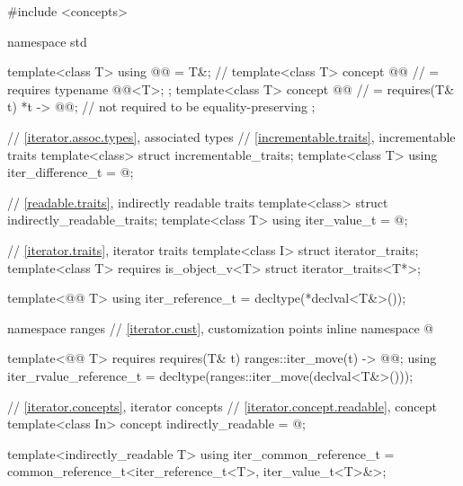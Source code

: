 %
%
%
\begin{codeblock}
#include <concepts>

namespace std {
  template<class T> using @@ = T&;  // \expos
  template<class T> concept @@       // \expos
    = requires { typename @@<T>; };
  template<class T> concept @@     // \expos
    = requires(T& t) {
      { *t } -> @@;  // not required to be equality-preserving
    };

  // \ref{iterator.assoc.types}, associated types
  // \ref{incrementable.traits}, incrementable traits
  template<class> struct incrementable_traits;
  template<class T>
    using iter_difference_t = @\seebelow@;

  // \ref{readable.traits}, indirectly readable traits
  template<class> struct indirectly_readable_traits;
  template<class T>
    using iter_value_t = @\seebelow@;

  // \ref{iterator.traits}, iterator traits
  template<class I> struct iterator_traits;
  template<class T> requires is_object_v<T> struct iterator_traits<T*>;

  template<@@ T>
    using iter_reference_t = decltype(*declval<T&>());

  namespace ranges {
    // \ref{iterator.cust}, customization points
    inline namespace @
  }

  template<@@ T>
    requires requires(T& t) {
      { ranges::iter_move(t) } -> @@;
    }
  using iter_rvalue_reference_t
    = decltype(ranges::iter_move(declval<T&>()));

  // \ref{iterator.concepts}, iterator concepts
  // \ref{iterator.concept.readable}, concept 
  template<class In>
    concept indirectly_readable = @\seebelow@;

  template<indirectly_readable T>
    using iter_common_reference_t =
      common_reference_t<iter_reference_t<T>, iter_value_t<T>&>;

}
\end{codeblock}
